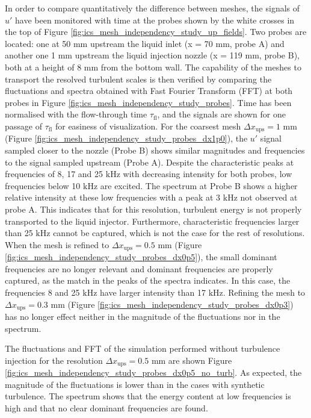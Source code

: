 In order to compare quantitatively the difference between meshes, the signals of $u'$ have been monitored with time at the probes shown by the white crosses in the top of Figure \ref{fig:ics_mesh_independency_study_up_fields}. Two probes are located: one at 50 mm upstream the liquid inlet (x = 70 mm, probe A) and another one 1 mm upstream the liquid injection nozzle (x = 119 mm, probe B), both at a height of 8 mm from the bottom wall. The capability of the meshes to transport the resolved turbulent scales is then verified by comparing the fluctuations and spectra obtained with Fast Fourier Transform (FFT) at both probes in Figure \ref{fig:ics_mesh_independency_study_probes}. Time has been normalised with the flow-through time $\tau_\mathrm{fl}$, and the signals are shown for one passage of $\tau_\mathrm{fl}$ for easiness of visualization. For the coarsest mesh $\Delta x_\mathrm{ups} = 1$ mm (Figure \ref{fig:ics_mesh_independency_study_probes_dx1p0}), the $u'$ signal sampled closer to the nozzle (Probe B) shows similar magnitudes and frequencies to the signal sampled upstream (Probe A). Despite the characteristic peaks at frequencies of 8, 17 and 25 $\mathrm{kHz}$ with decreasing intensity for both probes, low frequencies below 10 $\mathrm{kHz}$ are excited. The spectrum at Probe B shows a higher relative intensity at these low frequencies with a peak at 3 $\mathrm{kHz}$ not observed at probe A. This indicates that for this resolution, turbulent energy is not properly transported to the liquid injector. Furthermore, characteristic frequencies larger than 25 $\mathrm{kHz}$ cannot be captured, which is not the case for the rest of resolutions. When the mesh is refined to $\Delta x_\mathrm{ups} = 0.5$ mm (Figure \ref{fig:ics_mesh_independency_study_probes_dx0p5}), the small dominant frequencies are no longer relevant and dominant frequencies are properly captured, as the match in the peaks of the spectra indicates. In this case, the frequencies 8 and 25 $\mathrm{kHz}$ have larger intensity than 17 $\mathrm{kHz}$. Refining the mesh to $\Delta x_\mathrm{ups} = 0.3$ mm (Figure \ref{fig:ics_mesh_independency_study_probes_dx0p3}) has no longer effect neither in the magnitude of the fluctuations nor in the spectrum. 

The fluctuations and FFT of the simulation performed without turbulence injection for the resolution $\Delta x_\mathrm{ups} = 0.5$ mm are shown Figure \ref{fig:ics_mesh_independency_study_probes_dx0p5_no_turb}. As expected, the magnitude of the fluctuations is lower than in the cases with synthetic turbulence. The spectrum shows that the energy content at low frequencies is high and that no clear dominant frequencies are found. \\

